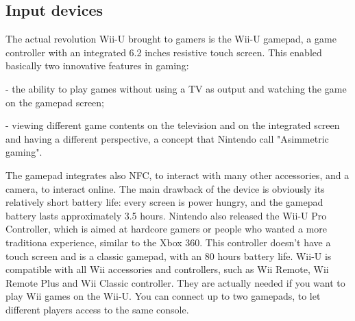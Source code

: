 \documentclass[a4paper,10pt]{book}
\begin{document}
 \subsection{ Input devices  }
  The actual revolution Wii-U brought to gamers is the Wii-U gamepad, a game controller with an integrated 6.2 inches resistive touch screen. This enabled basically two innovative features in gaming:
 
  - the ability to play games without using a TV as output and watching the game on the gamepad screen;
 
  - viewing different game contents on the television and on the integrated screen and having a different perspective, a concept that Nintendo call "Asimmetric gaming".
 
  The gamepad integrates also NFC, to interact with many other accessories, and a camera, to interact online.  
  The main drawback of the device is obviously its relatively short battery life: every screen is power hungry, and the gamepad battery lasts approximately 3.5 hours.  
  Nintendo also released the Wii-U Pro Controller, which is aimed at hardcore gamers or people who wanted a more traditiona experience, similar to the Xbox 360. This controller doesn't have a touch screen and is a classic gamepad, with an 80 hours battery life.  
  Wii-U is compatible with all Wii accessories and controllers, such as Wii Remote, Wii Remote Plus and Wii Classic controller. They are actually needed if you want to play Wii games on the Wii-U.  
  You can connect up to two gamepads, to let different players access to the same console.  
\end{document}
